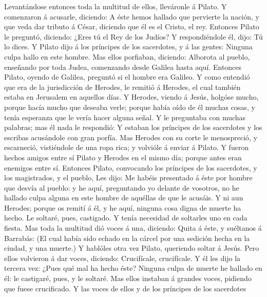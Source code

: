  Levantándose entonces toda la multitud de ellos, lleváronle
á Pilato.  Y comenzaron á acusarle, diciendo: A éste hemos
hallado que pervierte la nación, y que veda dar tributo á César,
diciendo que él es el Cristo, el rey.  Entonces Pilato le
preguntó, diciendo: ¿Eres tú el Rey de los Judíos? Y respondiéndole él,
dijo: Tú lo dices.  Y Pilato dijo á los príncipes de los
sacerdotes, y á las gentes: Ninguna culpa hallo en este hombre.
 Mas ellos porfiaban, diciendo: Alborota al pueblo,
enseñando por toda Judea, comenzando desde Galilea hasta aquí.
 Entonces Pilato, oyendo de Galilea, preguntó si el hombre
era Galileo.  Y como entendió que era de la jurisdicción de
Herodes, le remitió á Herodes, el cual también estaba en Jerusalem en
aquellos días.  Y Herodes, viendo á Jesús, holgóse mucho,
porque hacía mucho que deseaba verle; porque había oído de él muchas
cosas, y tenía esperanza que le vería hacer alguna señal.  Y
le preguntaba con muchas palabras; mas él nada le respondió:
 Y estaban los príncipes de los sacerdotes y los escribas
acusándole con gran porfía.  Mas Herodes con su corte le
menospreció, y escarneció, vistiéndole de una ropa rica; y volvióle á
enviar á Pilato.  Y fueron hechos amigos entre sí Pilato y
Herodes en el mismo día; porque antes eran enemigos entre sí.
 Entonces Pilato, convocando los príncipes de los
sacerdotes, y los magistrados, y el pueblo,  Les dijo: Me
habéis presentado á éste por hombre que desvía al pueblo: y he aquí,
preguntando yo delante de vosotros, no he hallado culpa alguna en este
hombre de aquéllas de que le acusáis.  Y ni aun Herodes;
porque os remití á él, y he aquí, ninguna cosa digna de muerte ha hecho.
 Le soltaré, pues, castigado.  Y tenía
necesidad de soltarles uno en cada fiesta.  Mas toda la
multitud dió voces á una, diciendo: Quita á éste, y suéltanos á
Barrabás:  (El cual había sido echado en la cárcel por una
sedición hecha en la ciudad, y una muerte.)  Y hablóles
otra vez Pilato, queriendo soltar á Jesús.  Pero ellos
volvieron á dar voces, diciendo: Crucifícale, crucifícale. 
Y él les dijo la tercera vez: ¿Pues qué mal ha hecho éste? Ninguna culpa
de muerte he hallado en él: le castigaré, pues, y le soltaré.
 Mas ellos instaban á grandes voces, pidiendo que fuese
crucificado. Y las voces de ellos y de los príncipes de los sacerdotes
